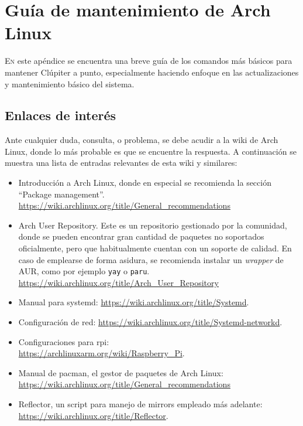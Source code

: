 \chapter{Guía de mantenimiento de Arch Linux}
\label{chap:archlinux_maintenance_guide}

\lettrine{E}{n} este apéndice se encuentra una breve guía de los comandos más básicos para mantener Clúpiter a punto, especialmente haciendo enfoque en las actualizaciones y mantenimiento básico del sistema.

\section{Enlaces de interés}
Ante cualquier duda, consulta, o problema, se debe acudir a la wiki de Arch Linux, donde lo más probable es que se encuentre la respuesta. A continuación se muestra una lista de entradas relevantes de esta wiki y similares:

\begin{itemize}
    \item Introducción a Arch Linux, donde en especial se recomienda la sección ``Package management''.
    \url{https://wiki.archlinux.org/title/General_recommendations}

    \item Arch User Repository. Este es un repositorio gestionado por la comunidad, donde se pueden encontrar gran cantidad de paquetes no soportados oficialmente, pero que habitualmente cuentan con un soporte de calidad. En caso de emplearse de forma asidura, se recomienda instalar un \textit{wrapper} de AUR, como por ejemplo \texttt{yay} o \texttt{paru}.\\
    \url{https://wiki.archlinux.org/title/Arch_User_Repository}

    \item Manual para systemd: \url{https://wiki.archlinux.org/title/Systemd}.
    \item Configuración de red: \url{https://wiki.archlinux.org/title/Systemd-networkd}.
    \item Configuraciones para \acrlong{rpi}: \\\url{https://archlinuxarm.org/wiki/Raspberry_Pi}.

    \item Manual de pacman, el gestor de paquetes de Arch Linux: \\\url{https://wiki.archlinux.org/title/General_recommendations}
    \item Reflector, un script para manejo de mirrors empleado más adelante: \\\url{https://wiki.archlinux.org/title/Reflector}.
\end{itemize}

